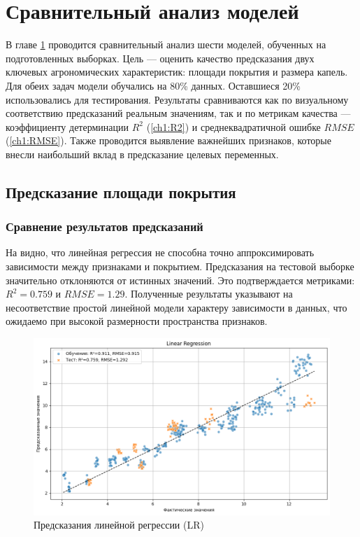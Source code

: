 \chapter{Сравнительный анализ моделей}\label{ch3}

В главе \ref{ch3} проводится сравнительный анализ шести моделей, обученных на подготовленных выборках. Цель --- оценить качество предсказания двух ключевых агрономических характеристик: площади покрытия и размера капель. Для обеих задач модели обучались на 80\% данных. Оставшиеся 20\% использовались для тестирования. Результаты сравниваются как по визуальному соответствию предсказаний реальным значениям, так и по метрикам качества --- коэффициенту детерминации $R^2$ (\ref{ch1:R2}) и среднеквадратичной ошибке $RMSE$ (\ref{ch1:RMSE}). Также проводится выявление важнейших признаков, которые внесли наибольший вклад в предсказание целевых переменных.

\section{Предсказание площади покрытия}\label{ch3:coverage}

\subsection{Сравнение результатов предсказаний}

На  видно, что линейная регрессия не способна точно аппроксимировать зависимости между признаками и покрытием. Предсказания на тестовой выборке значительно отклоняются от истинных значений. Это подтверждается метриками: $R^2 = 0.759$ и $RMSE = 1.29$. Полученные результаты указывают на несоответствие простой линейной модели характеру зависимости в данных, что ожидаемо при высокой размерности пространства признаков.

\begin{figure}[htbp!]
	\centering
	\includegraphics[width=.9\linewidth]{my_folder/images/coverage/Linear-Regression.png}
	\caption{Предсказания линейной регрессии (LR)} 
	\label{fig:coverage-lr}  
\end{figure}

